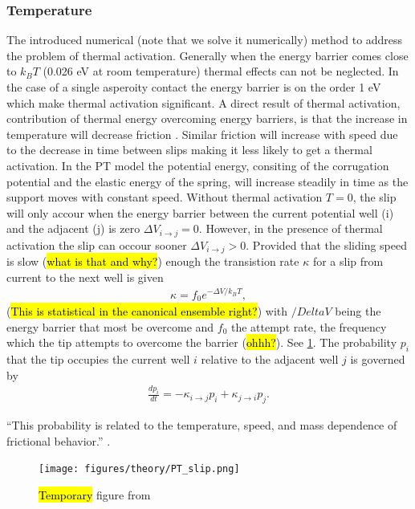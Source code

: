 \subsubsection{Temperature}
The introduced numerical (note that we solve it numerically) method to address
the problem of thermal activation. Generally when the energy barrier comes close
to $k_B T$ (0.026 eV at room temperature) thermal effects can not be neglected.
In the case of a single asperoity contact the energy barrier is on the order 1
eV which make thermal activation significant. A direct result of thermal
activation, contribution of thermal energy overcoming energy barriers, is that
the increase in temperature will decrease friction \cite[7, 21]{Yalin_2011}.
Similar friction will increase with speed \cite[4, 22–24]{Yalin_2011} due to the
decrease in time between slips making it less likely to get a thermal
activation. In the \acrshort{PT} model the potential energy, consiting of the
corrugation potential and the elastic energy of the spring, will increase
steadily in time as the support moves with constant speed. Without thermal
activation $T = 0$, the slip will only accour when the energy barrier between the current potential well (i) and the adjacent (j) is zero $\Delta V_{i\to j} = 0$. However, in the presence of thermal activation the slip can occour sooner  $\Delta V_{i\to j} > 0$. Provided that the sliding speed is slow (\hl{what is that and why?}) enough the transistion rate $\kappa$ for a slip from current to the next well is given
\begin{align*}
  \kappa = f_0 e^{-\Delta V / k_B T},
\end{align*}
(\hl{This is statistical in the canonical ensemble right?}) with $/Delta V$ being the energy barrier that most be overcome and $f_0$ the attempt rate, the frequency which the tip attempts to overcome the barrier (\hl{ohhh?}). See \cref{fig:PT_slip}. The probability $p_i$ that the tip occupies the current well $i$ relative to the adjacent well $j$ is governed by 
\begin{align*}
  \frac{dp_i}{dt} = -\kappa_{i\to j}p_i + \kappa_{j\to i}p_j.
\end{align*}


``This probability is related to the temperature, speed, and mass dependence of frictional behavior.'' \cite{Yalin_2011}.

\begin{figure}[H]
  \centering
  \texttt{[image: figures/theory/PT\_slip.png]}
  \caption{\hl{Temporary} figure from \cite{Yalin_2011}}
  \label{fig:PT_slip}
\end{figure}


